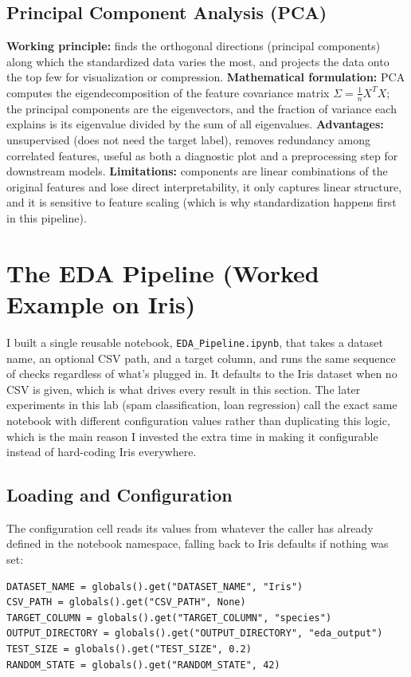 \documentclass[11pt,a4paper]{article}
\begin{document}
\subsection{Principal Component Analysis (PCA)}
\textbf{Working principle:} finds the orthogonal directions (principal components) along which the standardized data varies the most, and projects the data onto the top few for visualization or compression.
\textbf{Mathematical formulation:} PCA computes the eigendecomposition of the feature covariance matrix $\Sigma = \frac{1}{n}X^TX$; the principal components are the eigenvectors, and the fraction of variance each explains is its eigenvalue divided by the sum of all eigenvalues.
\textbf{Advantages:} unsupervised (does not need the target label), removes redundancy among correlated features, useful as both a diagnostic plot and a preprocessing step for downstream models.
\textbf{Limitations:} components are linear combinations of the original features and lose direct interpretability, it only captures linear structure, and it is sensitive to feature scaling (which is why standardization happens first in this pipeline).

\section{The EDA Pipeline (Worked Example on Iris)}
\label{sec:pipeline}

I built a single reusable notebook, \texttt{EDA\_Pipeline.ipynb}, that takes a dataset name, an optional CSV path, and a target column, and runs the same sequence of checks regardless of what's plugged in. It defaults to the Iris dataset when no CSV is given, which is what drives every result in this section. The later experiments in this lab (spam classification, loan regression) call the exact same notebook with different configuration values rather than duplicating this logic, which is the main reason I invested the extra time in making it configurable instead of hard-coding Iris everywhere.

\subsection{Loading and Configuration}
The configuration cell reads its values from whatever the caller has already defined in the notebook namespace, falling back to Iris defaults if nothing was set:

\begin{lstlisting}
DATASET_NAME = globals().get("DATASET_NAME", "Iris")
CSV_PATH = globals().get("CSV_PATH", None)
TARGET_COLUMN = globals().get("TARGET_COLUMN", "species")
OUTPUT_DIRECTORY = globals().get("OUTPUT_DIRECTORY", "eda_output")
TEST_SIZE = globals().get("TEST_SIZE", 0.2)
RANDOM_STATE = globals().get("RANDOM_STATE", 42)
\end{lstlisting}
\end{document}
